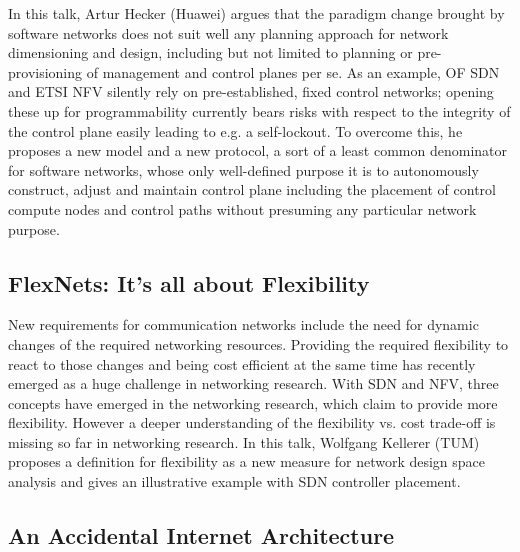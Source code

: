 In this talk, Artur Hecker (Huawei) argues that the paradigm change brought by
software networks does not suit well any planning approach for network
dimensioning and design, including but not limited to planning or
pre-provisioning of management and control planes per se. As an example, OF
\ac{SDN} and ETSI \ac{NFV} silently rely on pre-established, fixed control
networks; opening these up for programmability currently bears risks with
respect to the integrity of the control plane easily leading to e.g. a
self-lockout. To overcome this, he proposes a new model and a new protocol, a
sort of a least common denominator for software networks, whose only
well-defined purpose it is to autonomously construct, adjust and maintain
control plane including the placement of control compute nodes and control
paths without presuming any particular network purpose.

\subsection{FlexNets: It's all about Flexibility}

New requirements for communication networks include the need for dynamic
changes of the required networking resources. Providing the required
flexibility to react to those changes and being cost efficient at the same
time has recently emerged as a huge challenge in networking research. With
\ac{SDN} and \ac{NFV}, three concepts have emerged in the networking research,
which claim to provide more flexibility. However a deeper understanding of the
flexibility vs. cost trade-off is missing so far in networking research. In
this talk, Wolfgang Kellerer (TUM) proposes a definition for flexibility as a
new measure for network design space analysis \cite{wkellerer:infocom:2016}
and gives an illustrative example with \ac{SDN} controller placement.

\subsection{An Accidental Internet Architecture}

